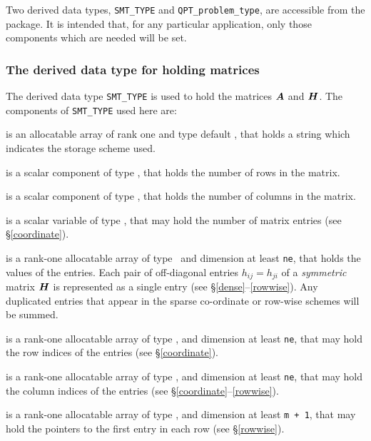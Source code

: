 \documentclass{galahad}
\newcommand{\packagename}{QPT}
\begin{document}

\galtype
Two derived data types,
{\tt SMT\_TYPE} and
{\tt \packagename\_problem\_type},
are accessible from the package. It is intended that, for any particular
application, only those components which are needed will be set.


\subsubsection{The derived data type for holding matrices}\label{typesmt}
The derived data type {\tt SMT\_TYPE} is used to hold the matrices ${\bm{A}}$
and ${\bm{H}}$. The components of {\tt SMT\_TYPE} used here are:

\begin{description}

 is an allocatable array of rank one and type default \character, 
that holds a string which indicates the storage scheme used.

 is a scalar component of type \integer,
that holds the number of rows in the matrix.

 is a scalar component of type \integer,
that holds the number of columns in the matrix.

 is a scalar variable of type \integer, that may
hold the number of matrix entries (see \S\ref{coordinate}).

 is a rank-one allocatable array of type \realdp\,
and dimension at least {\tt ne}, that holds the values of the entries.
Each pair of off-diagonal entries $h_{ij} = h_{ji}$ of a {\em symmetric}
matrix ${\bm{H}}$ is represented as a single entry
(see \S\ref{dense}--\ref{rowwise}).
Any duplicated entries that appear in the sparse
co-ordinate or row-wise schemes will be summed.

 is a rank-one allocatable array of type \integer,
and dimension at least {\tt ne}, that may hold the row indices of the entries
(see \S\ref{coordinate}).

 is a rank-one allocatable array of type \integer,
and dimension at least {\tt ne}, that may hold the column indices of the entries
(see \S\ref{coordinate}--\ref{rowwise}).

 is a rank-one allocatable array of type \integer,
and dimension at least {\tt m + 1}, that may hold the pointers to
the first entry in each row (see \S\ref{rowwise}).

\end{description}
\end{document}

